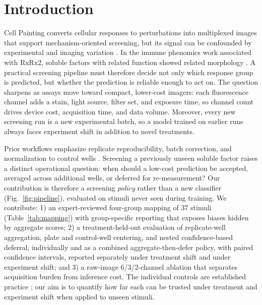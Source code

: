 \documentclass[conference]{IEEEtran}
\begin{document}
\section{Introduction}
Cell Painting converts cellular responses to perturbations into multiplexed images that support mechanism-oriented screening, but its signal can be confounded by experimental and imaging variation \cite{cimini2023,arevalo2024}. In the immune phenomics work associated with RxRx2, soluble factors with related function showed related morphology \cite{cuccarese2020}. A practical screening pipeline must therefore decide not only which response group is predicted, but whether the prediction is reliable enough to act on. The question sharpens as assays move toward compact, lower-cost imagers: each fluorescence channel adds a stain, light source, filter set, and exposure time, so channel count drives device cost, acquisition time, and data volume. Moreover, every new screening run is a new experimental batch, so a model trained on earlier runs always faces experiment shift in addition to novel treatments.

Prior workflows emphasize replicate reproducibility, batch correction, and normalization to control wells \cite{bray2016,caicedo2017,cimini2023,arevalo2024}. Screening a previously unseen soluble factor raises a distinct operational question: when should a low-cost prediction be accepted, averaged across additional wells, or deferred for re-measurement? Our contribution is therefore a screening \emph{policy} rather than a new classifier (Fig.~\ref{fig:pipeline}), evaluated on stimuli never seen during training. We contribute: 1) an expert-reviewed four-group mapping of 37 stimuli (Table~\ref{tab:mapping}) with group-specific reporting that exposes biases hidden by aggregate scores; 2) a treatment-held-out evaluation of replicate-well aggregation, plate and control-well centering, and nested confidence-based deferral, individually and as a combined aggregate-then-defer policy, with paired confidence intervals, reported separately under treatment shift and under experiment shift; and 3) a raw-image 6/3/2-channel ablation that separates acquisition burden from inference cost. The individual controls are established practice \cite{caicedo2017}; our aim is to quantify how far each can be trusted under treatment and experiment shift when applied to unseen stimuli.
\end{document}
